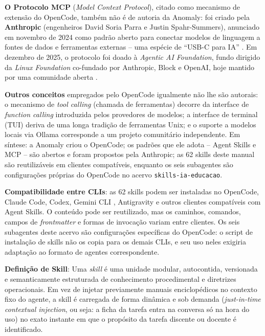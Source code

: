 \textbf{O Protocolo MCP} (\emph{Model Context Protocol}), citado como mecanismo de extens{\~a}o do OpenCode, tamb{\'e}m n{\~a}o {\'e} de autoria da Anomaly: foi criado pela \textbf{Anthropic} (engenheiros David Soria Parra e Justin Spahr-Summers), anunciado em novembro de 2024 como padr{\~a}o aberto para conectar modelos de linguagem a fontes de dados e ferramentas externas -- uma esp{\'e}cie de ``USB-C para IA'' \cite{anthropic2025mcp,parra2025mcp}. Em dezembro de 2025, o protocolo foi doado {\`a} \emph{Agentic AI Foundation}, fundo dirigido da \emph{Linux Foundation} co-fundado por Anthropic, Block e OpenAI, hoje mantido por uma comunidade aberta \cite{anthropic2025mcp}.

\textbf{Outros conceitos} empregados pelo OpenCode igualmente n{\~a}o lhe s{\~a}o autorais: o mecanismo de \emph{tool calling} (chamada de ferramentas) decorre da interface de \emph{function calling} introduzida pelos provedores de modelos; a interface de terminal (TUI) deriva de uma longa tradi{\c c}{\~a}o de ferramentas Unix; e o suporte a modelos locais via Ollama \cite{ollama2025ollama} corresponde a um projeto comunit{\'a}rio independente. Em s{\'i}ntese: a Anomaly criou o OpenCode; os padr{\~o}es que ele adota -- Agent Skills e MCP -- s{\~a}o abertos e foram propostos pela Anthropic; as 62 skills deste manual s{\~a}o reutiliz{\'a}veis em clientes compat{\'i}veis, enquanto os seis subagentes s{\~a}o configura{\c c}{\~o}es pr{\'o}prias do OpenCode no acervo \texttt{skills-ia-educacao}.

\newpage 
\begin{atencaopedagogica}
\textbf{Compatibilidade entre CLIs}: as 62 skills podem ser instaladas no OpenCode, Claude Code, Codex, Gemini CLI \cite{google2023gemini}, Antigravity e outros clientes compat{\'i}veis com Agent Skills. O conte{\'u}do pode ser reutilizado, mas os caminhos, comandos, campos de \emph{frontmatter} e formas de invoca{\c c}{\~a}o variam entre clientes. Os seis subagentes deste acervo s{\~a}o configura{\c c}{\~o}es espec{\'i}ficas do OpenCode: o script de instala{\c c}{\~a}o de skills n{\~a}o os copia para os demais CLIs, e seu uso neles exigiria adapta{\c c}{\~a}o ao formato de agentes correspondente.
\end{atencaopedagogica}

\begin{conceitochave}
\textbf{Defini{\c c}{\~a}o de Skill}: Uma \emph{skill} {\'e} uma unidade modular, autocontida, versionada e semanticamente estruturada de conhecimento procedimental e diretrizes operacionais. Em vez de injetar previamente manuais enciclop{\'e}dicos no contexto fixo do agente, a skill {\'e} carregada de forma din{\^a}mica e sob demanda (\emph{just-in-time contextual injection}, ou seja: a ficha da tarefa entra na conversa s{\'o} na hora do uso) no exato instante em que o prop{\'o}sito da tarefa discente ou docente {\'e} identificado.
\end{conceitochave}

